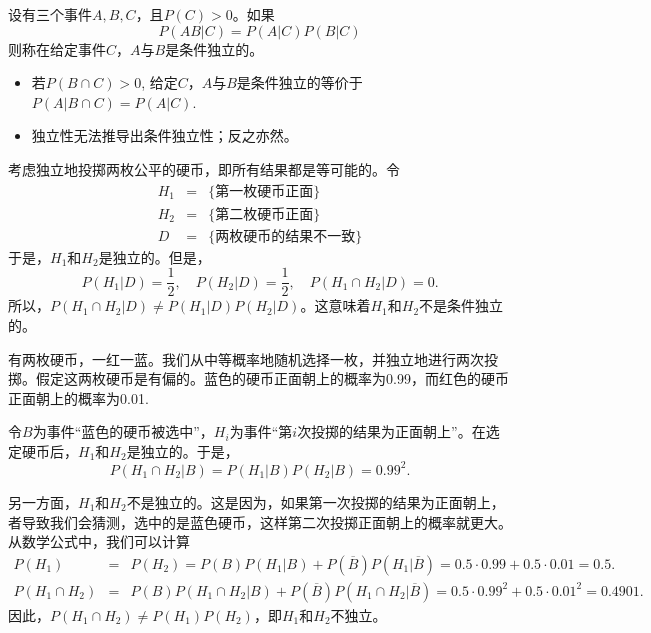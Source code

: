 \begin{definition}[条件独立性]
    设有三个事件$A,B,C$，且$P(C)>0$。如果
    $$
    P(AB|C) = P(A|C) P(B|C)
    $$
    则称在给定事件$C$，$A$与$B$是条件独立的。
\end{definition}
\begin{remark}
    \begin{itemize}
        \item 若$P(B\cap C)>0$, 给定$C$，$A$与$B$是条件独立的等价于$P(A|B\cap C) = P(A|C)$.
        \item 独立性无法推导出条件独立性；反之亦然。
    \end{itemize}
\end{remark}
\begin{example}
    考虑独立地投掷两枚公平的硬币，即所有结果都是等可能的。令
    \begin{eqnarray*}
        H_1 &=& \{\text{第一枚硬币正面}\}\\
        H_2 &=& \{\text{第二枚硬币正面}\}\\
        D &=&  \{\text{两枚硬币的结果不一致}\}
    \end{eqnarray*}
    于是，$H_1$和$H_2$是独立的。但是，
    $$
    P(H_1|D) = \frac{1}{2},\quad P(H_2|D) = \frac{1}{2},\quad P(H_1\cap H_2|D) =0.
    $$
    所以，$P(H_1\cap H_2|D) \neq P(H_1|D) P(H_2|D)$。这意味着$H_1$和$H_2$不是条件独立的。
\end{example}
\begin{example}
    有两枚硬币，一红一蓝。我们从中等概率地随机选择一枚，并独立地进行两次投掷。假定这两枚硬币是有偏的。蓝色的硬币正面朝上的概率为0.99，而红色的硬币正面朝上的概率为0.01.

    令$B$为事件“蓝色的硬币被选中”，$H_i$为事件“第$i$次投掷的结果为正面朝上”。在选定硬币后，$H_1$和$H_2$是独立的。于是，
    $$
    P(H_1 \cap H_2 | B) = P(H_1|B) P(H_2|B) = 0.99^2.
    $$

    另一方面，$H_1$和$H_2$不是独立的。这是因为，如果第一次投掷的结果为正面朝上，者导致我们会猜测，选中的是蓝色硬币，这样第二次投掷正面朝上的概率就更大。从数学公式中，我们可以计算
    \begin{eqnarray*}
        P(H_1) &=& P(H_2) = P(B)P(H_1|B) + P(\overline{B})P(H_1|\overline{B}) = 0.5 \cdot 0.99 + 0.5 \cdot 0.01 = 0.5.\\
        P(H_1\cap H_2) &=& P(B) P(H_1\cap H_2|B) + P(\overline{B})P(H_1\cap H_2|\overline{B}) = 0.5 \cdot 0.99^2 + 0.5 \cdot 0.01^2 = 0.4901.
    \end{eqnarray*}
    因此，$P(H_1\cap H_2) \neq P(H_1)P(H_2)$，即$H_1$和$H_2$不独立。
\end{example}
